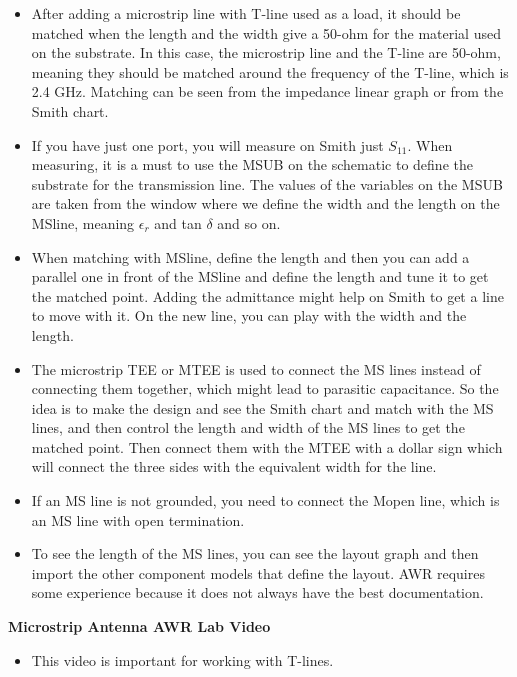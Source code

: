 \documentclass{article}
\begin{document}
\begin{itemize}
    \item After adding a microstrip line with T-line used as a load, it should be matched when the length and the width give a 50-ohm for the material used on the substrate. In this case, the microstrip line and the T-line are 50-ohm, meaning they should be matched around the frequency of the T-line, which is 2.4 GHz. Matching can be seen from the impedance linear graph or from the Smith chart.
    \item If you have just one port, you will measure on Smith just \( S_{11} \). When measuring, it is a must to use the MSUB on the schematic to define the substrate for the transmission line. The values of the variables on the MSUB are taken from the window where we define the width and the length on the MSline, meaning \( \epsilon_r \) and tan \( \delta \) and so on.
    \item When matching with MSline, define the length and then you can add a parallel one in front of the MSline and define the length and tune it to get the matched point. Adding the admittance might help on Smith to get a line to move with it. On the new line, you can play with the width and the length.
    \item The microstrip TEE or MTEE is used to connect the MS lines instead of connecting them together, which might lead to parasitic capacitance. So the idea is to make the design and see the Smith chart and match with the MS lines, and then control the length and width of the MS lines to get the matched point. Then connect them with the MTEE with a dollar sign which will connect the three sides with the equivalent width for the line.
    \item If an MS line is not grounded, you need to connect the Mopen line, which is an MS line with open termination.
    \item To see the length of the MS lines, you can see the layout graph and then import the other component models that define the layout. AWR requires some experience because it does not always have the best documentation.
\end{itemize}

\textbf{Microstrip Antenna AWR Lab Video}
\begin{itemize} 
    \item This video is important for working with T-lines.
\end{itemize}
\end{document}
